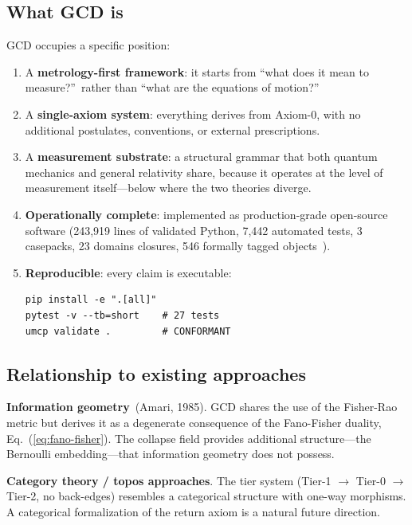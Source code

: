 \documentclass[
  aps,
  prd,
  twocolumn,
  superscriptaddress,
  nofootinbib,
  floatfix
]{revtex4-2}
\begin{document}
\subsection{What GCD is}

GCD occupies a specific position:

\begin{enumerate}[leftmargin=*,label=(\roman*)]
\item A \textbf{metrology-first framework}: it starts from ``what
  does it mean to measure?''\ rather than ``what are the equations
  of motion?''

\item A \textbf{single-axiom system}: everything derives from
  Axiom-0, with no additional postulates, conventions, or external
  prescriptions.

\item A \textbf{measurement substrate}: a structural grammar that
  both quantum mechanics and general relativity share, because it
  operates at the level of measurement itself---below where the two
  theories diverge.

\item \textbf{Operationally complete}: implemented as
  production-grade open-source software (243{,}919 lines of
  validated Python, 7{,}442 automated tests, 3 casepacks,
  23 domains closures, 546 formally tagged
  objects~\cite{umcpmetadatarepo}).

\item \textbf{Reproducible}: every claim is executable:
  \begingroup\small
  \begin{verbatim}
pip install -e ".[all]"
pytest -v --tb=short    # 27 tests
umcp validate .         # CONFORMANT
  \end{verbatim}
  \endgroup
\end{enumerate}

\subsection{Relationship to existing approaches}

\textbf{Information geometry}~(Amari, 1985).  GCD shares the use of
the Fisher-Rao metric but derives it as a degenerate consequence of
the Fano-Fisher duality, Eq.~(\ref{eq:fano-fisher}).  The collapse
field provides additional structure---the Bernoulli embedding---that
information geometry does not possess.

\textbf{Category theory / topos approaches}.  The tier system
(Tier-1 $\to$ Tier-0 $\to$ Tier-2, no back-edges) resembles a
categorical structure with one-way morphisms.  A categorical
formalization of the return axiom is a natural future direction.
\end{document}
